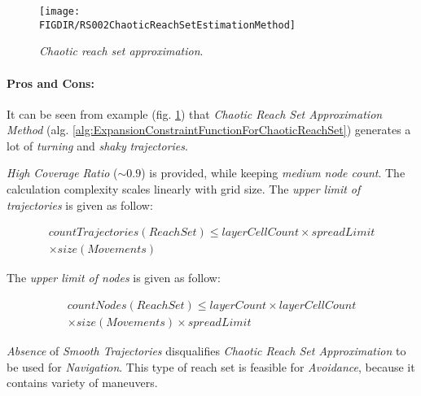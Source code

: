 \begin{figure}[H]
    \centering
    \texttt{[image: \\FIGDIR/RS002ChaoticReachSetEstimationMethod]} 
    \caption{\emph{Chaotic \emph{reach set} approximation}.}
    \label{fig:chaoticReachSetApproximation}
\end{figure}


\paragraph{Pros and Cons:} It can be seen from example (fig. \ref{fig:chaoticReachSetApproximation}) that \emph{Chaotic Reach Set Approximation Method} (alg. \ref{alg:ExpansionConstraintFunctionForChaoticReachSet}) generates a lot of \emph{turning} and \emph{shaky} \emph{trajectories}. 

\emph{High Coverage Ratio} ($\sim 0.9$) is provided, while keeping \emph{medium node count}. The calculation complexity scales linearly with grid size. The \emph{upper limit of trajectories} is given as follow:

\begin{multline}
    countTrajectories(ReachSet) \le layerCellCount \times spreadLimit\\ \times size(Movements)
\end{multline}

\noindent The \emph{upper limit of nodes} is given as follow:
    
\begin{multline}
    countNodes(ReachSet) \le layerCount \times  layerCellCount  \\
    \times size(Movements) \times spreadLimit  
\end{multline}

\noindent\emph{Absence} of \emph{Smooth Trajectories} disqualifies \emph{Chaotic Reach Set Approximation} to be used for \emph{Navigation}. This type of reach set is feasible for \emph{Avoidance}, because it contains variety of maneuvers.


